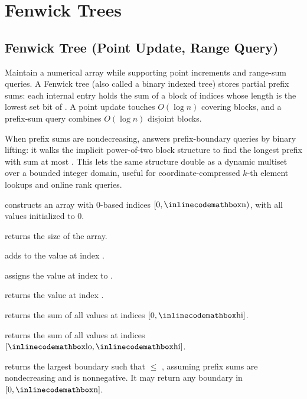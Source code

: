 \section{\texorpdfstring{Fenwick Trees}{2.7 Fenwick Trees}}
\setcounter{section}{7}
\setcounter{subsection}{0}
\subsection{Fenwick Tree (Point Update, Range Query)}
\label{sec:2.7.1}
Maintain a numerical array while supporting point increments and range-sum queries. A Fenwick tree (also called a binary indexed tree) stores partial prefix sums: each internal entry  holds the sum of a block of indices whose length is the lowest set bit of . A point update touches $O(\log n)$ covering blocks, and a prefix-sum query combines $O(\log n)$ disjoint blocks.

When prefix sums are nondecreasing,  answers prefix-boundary queries by binary lifting: it walks the implicit power-of-two block structure to find the longest prefix with sum at most . This lets the same structure double as a dynamic multiset over a bounded integer domain, useful for coordinate-compressed $k$-th element lookups and online rank queries.

\begin{compactitem}
  \item {} constructs an array with 0-based indices $[0, {\inlinecodemath{n}})$, with all values initialized to $0$.
  \item {} returns the size of the array.
  \item {} adds  to the value at index .
  \item {} assigns the value at index  to .
  \item {} returns the value at index .
  \item {} returns the sum of all values at indices $[0, {\inlinecodemath{hi}}]$.
  \item {} returns the sum of all values at indices $[{\inlinecodemath{lo}}, {\inlinecodemath{hi}}]$.
  \item {} returns the largest boundary  such that  $\leq$ , assuming prefix sums are nondecreasing and  is nonnegative. It may return any boundary in $[0, {\inlinecodemath{n}}]$.
\end{compactitem}

